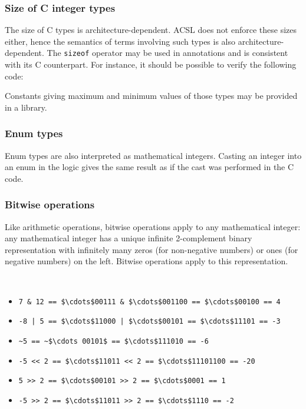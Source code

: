 \subsubsection{Size of C integer types}

The size of C types is architecture-dependent. ACSL does
not enforce these sizes either, hence the semantics of terms involving
such types is also architecture-dependent. The
\lstinline|sizeof| operator may be used in annotations and is
consistent with its C counterpart. For instance, it should be
possible to verify the following code:


Constants giving maximum and minimum values of those types may be
provided in a library.


\subsubsection{Enum types}

Enum types are also interpreted as mathematical integers. Casting
an integer into an enum in the logic gives the same result as
if the cast was performed in the C code.

\subsubsection{Bitwise operations}

Like arithmetic operations, bitwise operations apply to any
mathematical integer: any mathematical integer has a unique infinite
2-complement binary representation with infinitely many zeros (for
non-negative numbers) or ones (for negative numbers) on the left.
Bitwise operations apply to this representation.
\begin{example} ~
  \begin{itemize}
  \item \lstinline|7 & 12 == $\cdots$00111 & $\cdots$001100 == $\cdots$00100 == 4|
  \item \lstinline+-8 | 5 == $\cdots$11000 | $\cdots$00101 == $\cdots$11101 == -3+
  \item \lstinline+~5 == ~$\cdots 00101$ == $\cdots$111010 == -6+
  \item \lstinline+-5 << 2 == $\cdots$11011 << 2 == $\cdots$11101100 == -20+
  \item \lstinline+5 >> 2 == $\cdots$00101 >> 2 == $\cdots$0001 == 1+
  \item \lstinline+-5 >> 2 == $\cdots$11011 >> 2 == $\cdots$1110 == -2+
  \end{itemize}
\end{example}

